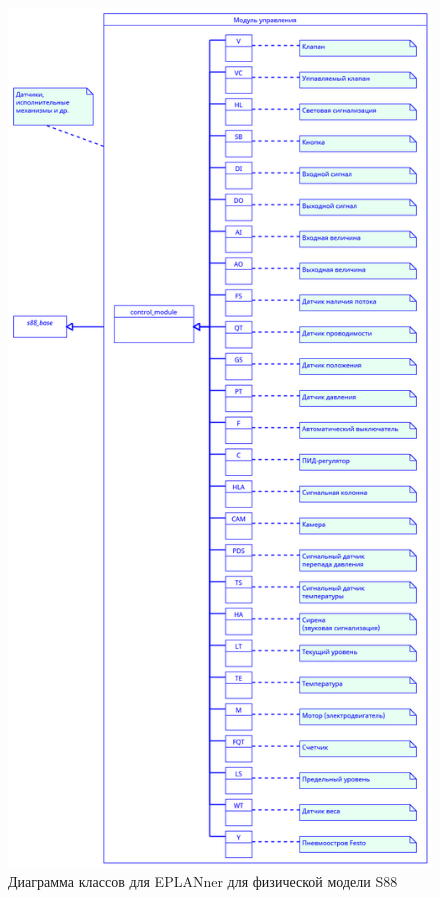 \begin{figure}[H]
    \centering
    \includegraphics[width=\textwidth,height=\textheight,keepaspectratio]{images/chapter_4/s88_control_modules.png}
    \caption{Диаграмма классов для EPLANner для физической модели S88}
    \label{fig:s88_control_modules}
\end{figure}

